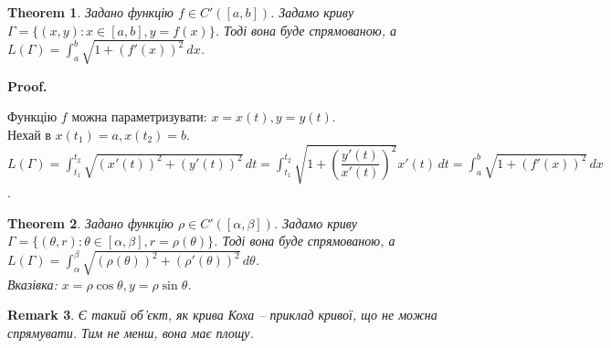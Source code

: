 \documentclass[a4paper, 10pt]{article}
\makeatletter
\def\huge{\displaystyle}
\def\qed{$\blacksquare$}
\theoremstyle{theoremdd}
\newtheorem{theorem}{Theorem}[subsection]
\theoremstyle{theoremdd}
\theoremstyle{theoremdd}
\theoremstyle{theoremdd}
\theoremstyle{theoremdd}
\theoremstyle{theoremdd}
\theoremstyle{theoremdd}
\newtheorem{remark}[theorem]{Remark}
\theoremstyle{theoremdd}
\theoremstyle{theoremdd}
\renewenvironment{proof}[1][Proof.\\]{\par
\pushQED{\hfill \qed}%
\normalfont \topsep6\p@\@plus6\p@\relax
\trivlist
\item\relax
{\bfseries
#1\@addpunct{.}}\hspace\labelsep\ignorespaces
}{%
\popQED\endtrivlist\@endpefalse
}
\makeatother
\begin{document}
\begin{theorem}
Задано функцію $f \in C'([a,b])$. Задамо криву $\Gamma = \{(x,y): x \in [a,b], y = f(x) \}$. Тоді вона буде спрямованою, а $L(\Gamma) = \huge\int_a^b \sqrt{1+(f'(x))^2}\,dx$.
\end{theorem}

\begin{proof}
Функцію $f$ можна параметризувати: $x = x(t), y = y(t)$.\\
Нехай в $x(t_1) = a, x(t_2) = b$.\\
$L(\Gamma) = \huge\int_{t_1}^{t_2} \sqrt{(x'(t))^2 + (y'(t))^2}\,dt = \int_{t_1}^{t_2} \sqrt{1 + \left(\dfrac{y'(t)}{x'(t)}\right)^2} x'(t)\,dt = \int_a^b \sqrt{1+(f'(x))^2}\,dx$.
\end{proof}

\begin{theorem}
Задано функцію $\rho \in C'([\alpha,\beta])$. Задамо криву $\Gamma = \{ (\theta,r): \theta \in [\alpha,\beta], r = \rho (\theta) \}$. Тоді вона буде спрямованою, а $L(\Gamma) = \huge\int_{\alpha}^{\beta} \sqrt{(\rho (\theta))^2 + (\rho'(\theta))^2}\,d\theta$.\\
\textit{Вказівка: $x = \rho \cos \theta, y = \rho \sin \theta$}.
\end{theorem}

\begin{remark}
Є такий об'єкт, як крива Коха -- приклад кривої, що не можна спрямувати. Тим не менш, вона має площу.
\end{remark}
\end{document}
